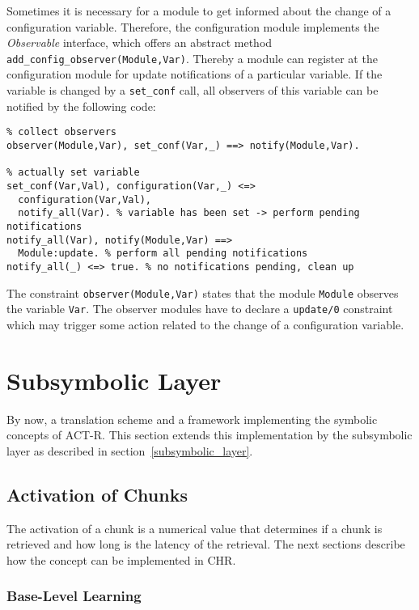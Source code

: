 Sometimes it is necessary for a module to get informed about the change of a configuration variable. Therefore, the configuration module implements the \emph{Observable} interface, which offers an abstract method \lstinline|add_config_observer(Module,Var)|. Thereby a module can register at the configuration module for update notifications of a particular variable. If the variable is changed by a \lstinline|set_conf| call, all observers of this variable can be notified by the following code:

\begin{lstlisting}
% collect observers
observer(Module,Var), set_conf(Var,_) ==> notify(Module,Var).

% actually set variable
set_conf(Var,Val), configuration(Var,_) <=> 
  configuration(Var,Val),
  notify_all(Var). % variable has been set -> perform pending notifications
notify_all(Var), notify(Module,Var) ==> 
  Module:update. % perform all pending notifications
notify_all(_) <=> true. % no notifications pending, clean up
\end{lstlisting}

The constraint \lstinline|observer(Module,Var)| states that the module \lstinline|Module| observes the variable \lstinline|Var|. The observer modules have to declare a \lstinline|update/0| constraint which may trigger some action related to the change of a configuration variable.

\section{Subsymbolic Layer}

By now, a translation scheme and a framework implementing the symbolic concepts of ACT-R. This section extends this implementation by the subsymbolic layer as described in section~\ref{subsymbolic_layer}.

\subsection{Activation of Chunks}

The activation of a chunk is a numerical value that determines if a chunk is retrieved and how long is the latency of the retrieval. The next sections describe how the concept can be implemented in CHR.

\subsubsection{Base-Level Learning}

